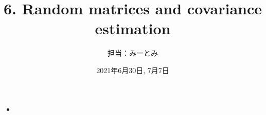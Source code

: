 \documentclass[unicode,aspectratio=169,11pt]{beamer}
\title{6. Random matrices and covariance estimation}
\author{担当：みーとみ}
\date{2021年6月30日, 7月7日}
\begin{document}
\maketitle

\begin{frame}{}{}
    \begin{itemize}
        \item 
    \end{itemize}
\end{frame}
\end{document}
